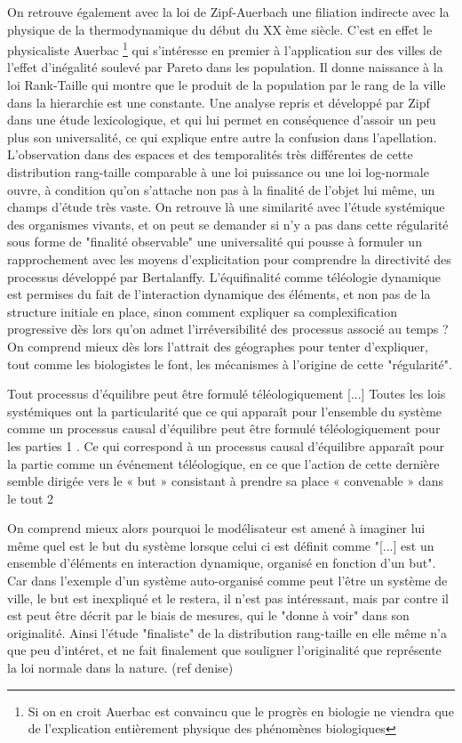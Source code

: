 {On retrouve également avec la loi de Zipf-Auerbach une filiation indirecte avec la physique de la thermodynamique du début du XX ème siècle. C'est en effet le physicaliste Auerbac \footnote{ Si on en croit \autocite[87]{Pouvreau2013} Auerbac est convaincu que le progrès en biologie ne viendra que de l'explication entièrement physique des phénomènes biologiques} qui s’intéresse en premier à l'application sur des villes de l'effet d'inégalité soulevé par Pareto dans les population.\autocite[94]{Rosser} Il donne naissance à la loi Rank-Taille  qui montre que le produit de la population par le rang de la ville dans la hierarchie est une constante. Une analyse repris et développé par Zipf dans une étude lexicologique, et qui lui permet en conséquence d'assoir un peu plus son universalité, ce qui explique entre autre la confusion dans l'apellation. L'observation dans des espaces et des temporalités très différentes \autocite{Pumain1997} de cette distribution rang-taille comparable à une loi puissance ou une loi log-normale ouvre, à condition qu'on s'attache non pas à la finalité de l'objet lui même, un champs d'étude très vaste. On retrouve là une similarité avec l'étude systémique des organismes vivants, et on peut se demander si n'y a pas dans cette régularité sous forme de "finalité observable" une universalité qui pousse à formuler un rapprochement avec les moyens d'explicitation pour comprendre la directivité des processus développé par Bertalanffy. L'équifinalité comme téléologie dynamique est permises du fait de l'interaction dynamique des éléments, et non pas de la structure initiale en place, sinon comment expliquer sa complexification progressive dès lors qu'on admet l'irréversibilité des processus associé au temps ? On comprend mieux dès lors l'attrait des géographes pour tenter d'expliquer, tout comme les biologistes le font, les mécanismes à l'origine de cette "régularité".

\autocite[114]{Pouvreau2013}
Tout processus d’équilibre peut être formulé téléologiquement [...] Toutes les lois systémiques ont
la particularité que ce qui apparaît pour l’ensemble du système comme un processus causal
d’équilibre peut être formulé téléologiquement pour les parties 1 .
Ce qui correspond à un processus causal d’équilibre apparaît pour la partie comme un événement
téléologique, en ce que l’action de cette dernière semble dirigée vers le « but » consistant à prendre
sa place « convenable » dans le tout 2


On comprend mieux alors pourquoi le modélisateur est amené à imaginer lui même quel est le but du système lorsque celui ci est définit comme "[...] est un ensemble d'éléments en interaction dynamique, organisé en fonction d'un but". Car dans l'exemple d'un système auto-organisé comme peut l'être un système de ville, le but est inexpliqué et le restera, il n'est pas intéressant, mais par contre il est peut être décrit par le biais de mesures, qui le "donne à voir" dans son originalité. Ainsi l'étude "finaliste" de la distribution rang-taille en elle même n'a que peu d'intéret, et ne fait finalement que souligner l'originalité que représente la loi normale dans la nature. (ref denise)

}
